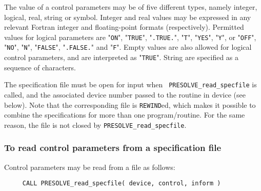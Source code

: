 \documentclass{galahad}
\newcommand{\packagename}{PRESOLVE}
\newcommand{\sym}{\tt\small}
\begin{document}
The value of a control parameters may be of five different types, namely
integer, logical, real, string or symbol.
Integer and real values may be expressed in any relevant Fortran integer and
floating-point formats (respectively). Permitted values for logical
parameters are "{\tt ON}", "{\tt TRUE}", "{\tt .TRUE.}", "{\tt T}", 
"{\tt YES}", "{\tt Y}", or "{\tt OFF}", "{\tt NO}",
"{\tt N}", "{\tt FALSE}", "{\tt .FALSE.}" and "{\tt F}". 
Empty values are also allowed for logical control parameters, and are
interpreted as "{\tt TRUE}". String are specified as a sequence of characters.  

The specification file must be open for input when {\tt
\packagename\_read\_specfile} is called, and the associated device number
passed to the routine in device (see below).  Note that the corresponding  
file is {\tt REWIND}ed, which makes it possible to combine the specifications 
for more than one program/routine.  For the same reason, the file is not
closed by {\tt \packagename\_read\_specfile}.

\subsubsection{To read control parameters from a specification file}
\label{readspec}

Control parameters may be read from a file as follows:
\hskip0.5in 
\def\baselinestretch{0.8} {\tt \begin{verbatim}
     CALL PRESOLVE_read_specfile( device, control, inform )
\end{verbatim}}
\def\baselinestretch{1.0}
\end{document}
